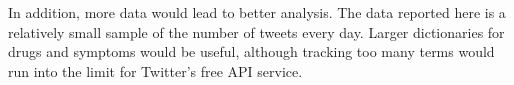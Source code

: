 \documentclass[letterpaper]{article}
\begin{document}
In addition, more data would lead to better analysis. The data reported here is a relatively small sample of the number of tweets every day. Larger dictionaries for drugs and symptoms would be useful, although tracking too many terms would run into the limit for Twitter's free API service.

%
%


\end{document}
